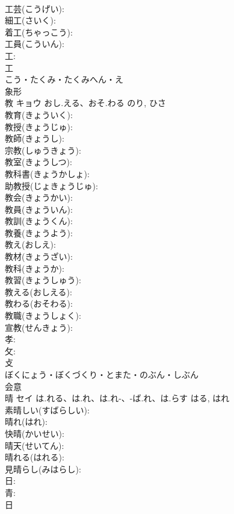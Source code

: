 \documentclass[8pt]{extreport}
\begin{document}
\begin{CJK}{UTF8}{min}
\\	工芸(こうげい): 
\\	細工(さいく): 
\\	着工(ちゃっこう): 
\\	工員(こういん): 
\\	工: 
\\	工	
\\	こう・たくみ・たくみへん・え	
\\	象形 
\\	教	キョウ	おし.える、おそ.わる	のり, ひさ	
\\	教育(きょういく): 
\\	教授(きょうじゅ): 
\\	教師(きょうし): 
\\	宗教(しゅうきょう): 
\\	教室(きょうしつ): 
\\	教科書(きょうかしょ): 
\\	助教授(じょきょうじゅ): 
\\	教会(きょうかい): 
\\	教員(きょういん): 
\\	教訓(きょうくん): 
\\	教養(きょうよう): 
\\	教え(おしえ): 
\\	教材(きょうざい): 
\\	教科(きょうか): 
\\	教習(きょうしゅう): 
\\	教える(おしえる): 
\\	教わる(おそわる): 
\\	教職(きょうしょく): 
\\	宣教(せんきょう): 
\\	孝: 
\\	攵: 
\\	攴	
\\	ぼくにょう・ぼくづくり・とまた・のぶん・しぶん	
\\	会意 
\\	晴	セイ	は.れる、は.れ、は.れ-、-ば.れ、は.らす	はる, はれ	
\\	素晴しい(すばらしい): 
\\	晴れ(はれ): 
\\	快晴(かいせい): 
\\	晴天(せいてん): 
\\	晴れる(はれる): 
\\	見晴らし(みはらし): 
\\	日: 
\\	青: 
\\	日	

\end{CJK}
\end{document}
